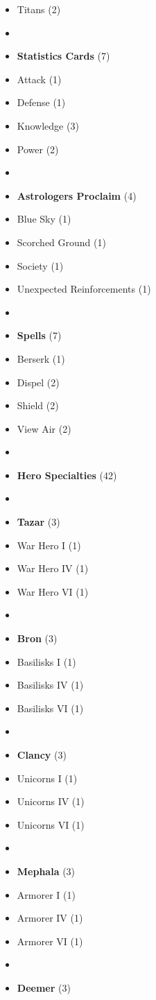 \begin{multicols}{3}
\begin{itemize}[leftmargin=0pt, label={}, noitemsep]
  \item Titans (2)
  \item
  \item \textbf{Statistics Cards} (7)
  \item Attack (1)
  \item Defense (1)
  \item Knowledge (3)
  \item Power (2)
  \item
  \item \textbf{Astrologers Proclaim} (4)
  \item Blue Sky (1)
  \item Scorched Ground (1)
  \item Society (1)
  \item Unexpected Reinforcements (1)
  \item
  \item \textbf{Spells} (7)
  \item Berserk (1)
  \item Dispel (2)
  \item Shield (2)
  \item View Air (2)
  \item
  \item \textbf{Hero Specialties} (42)
  \item
  \item \textbf{Tazar} (3)
  \item War Hero I (1)
  \item War Hero IV (1)
  \item War Hero VI (1)
  \item
  \item \textbf{Bron} (3)
  \item Basilisks I (1)
  \item Basilisks IV (1)
  \item Basilisks VI (1)
  \item
  \item \textbf{Clancy} (3)
  \item Unicorns I (1)
  \item Unicorns IV (1)
  \item Unicorns VI (1)
  \item
  \item \textbf{Mephala} (3)
  \item Armorer I (1)
  \item Armorer IV (1)
  \item Armorer VI (1)
  \item
  \item \textbf{Deemer} (3)

\end{itemize}
\end{multicols}
